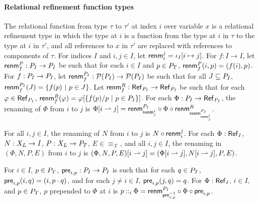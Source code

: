 \paragraph{Relational refinement function types}
%
The relational function from type $\tau$ to $\tau'$ at index $i$ over
variable $x$ is a relational refinement type in which the type at $i$
is a function from the type at $i$ in $\tau$ to the type at $i$ in
$\tau'$, and all references to $x$ in $\tau'$ are replaced with
references to components of $\tau$.
For indices $I$ and $i, j \in I$, let
$\mathsf{renm}_{i}^{j} = \iota_I  [ i \mapsto j ]$.
For $f : I \to I$, let $\mathsf{renm}_{f}^P : P_{I} \to P_{I}$ be
such that for each $i \in I$ and $p \in P_T$,
$\mathsf{renm}_{f}^P(i, p) = (f(i), p)$.
For $f : P_{I} \to P_{I}$, let
$\mathsf{renm}_{f}^{P_I} : \mathcal{P}(P_{I}) \to \mathcal{P}(P_{I})$ be such
that for all $J \subseteq P_{I}$, $\renameidxpos{f}(J) = %
\setformer{ f(p) }{ p \in J }$.
Let
$\mathsf{renm}_{f}^R : \mathsf{Ref}_{ P_{I} } \to \mathsf{Ref}_{ P_{I} }$
be such that for each $\varphi \in \mathsf{Ref}_{ P_{I} }$,
$\mathsf{renm}_{f}^R(\varphi) = \varphi[ \{  f(p) / p \ |\  p \in
  P_{I}  \} ]$.
%
For each $\Phi : P_{I} \to \mathsf{Ref}_{ P_{I} }$, the renaming
of $\Phi$ from $i$ to $j$ is
$ \Phi [  i  \rightharpoonup  j  ] = \mathsf{renm}_{ \mathsf{renm}_{j}^{i} }^{P_I} \circ
\Phi \circ \mathsf{renm}_{ \mathsf{renm}_{ \mathsf{renm}_{j}^{i} }^{P_I} }^R$.

For all $i, j \in I$, the renaming of $N$ from $i$ to $j$ is
$N \circ \mathsf{renm}_{i}^{j}$.
%
For each $\Phi : \mathsf{Ref}_{ I }$, $N : X_L \to I$,
$P : X_L \to P_T$, $E \in \equiv_{\mathcal{X}}$, and all
$i, j \in I$, the renaming in $(\Phi, N, P, E)$ from $i$ to $j$ is
$(\Phi, N, P, E) [  i  \rightharpoonup  j  ] = ( \Phi [  i  \rightharpoonup  j  ],
 N [  i  \rightharpoonup  j  ], P, E)$.

For $i \in I$, $p \in P_T$,
$\mathsf{pre}_{i, p} : P_{I} \to P_{I}$ is such that for each
$q \in P_T$, $\mathsf{pre}_{i, p}(i, q) = (i, p \cdot q)$, and for
each $j \not= i \in I$, $\mathsf{pre}_{i, p}(j, q) = q$.
%
For $\Phi : \mathsf{Ref}_{ I }$, $i \in I$, and $p \in P_T$, $p$
prepended to $\Phi$ at $i$ is $p \prepend{i} \Phi = %
\renameidxpos{ \inv{ \prependpos{i}{p} } } \compose \Phi \compose
\prependpos{i}{p}$.

